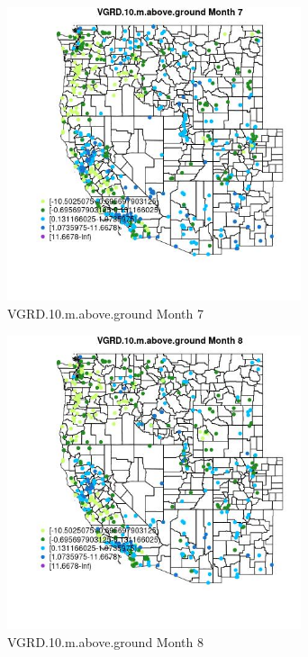 \begin{figure} 
\centering  
\includegraphics[width=0.77\textwidth]{Code_Outputs/Report_ML_input_PM25_Step4_part_e_de_duplicated_aves_compiled_2019-05-14wNAs_MapObsMo7VGRD10maboveground.jpg} 
\caption{\label{fig:Report_ML_input_PM25_Step4_part_e_de_duplicated_aves_compiled_2019-05-14wNAsMapObsMo7VGRD10maboveground}VGRD.10.m.above.ground Month 7} 
\end{figure} 
 

\begin{figure} 
\centering  
\includegraphics[width=0.77\textwidth]{Code_Outputs/Report_ML_input_PM25_Step4_part_e_de_duplicated_aves_compiled_2019-05-14wNAs_MapObsMo8VGRD10maboveground.jpg} 
\caption{\label{fig:Report_ML_input_PM25_Step4_part_e_de_duplicated_aves_compiled_2019-05-14wNAsMapObsMo8VGRD10maboveground}VGRD.10.m.above.ground Month 8} 
\end{figure} 
 

